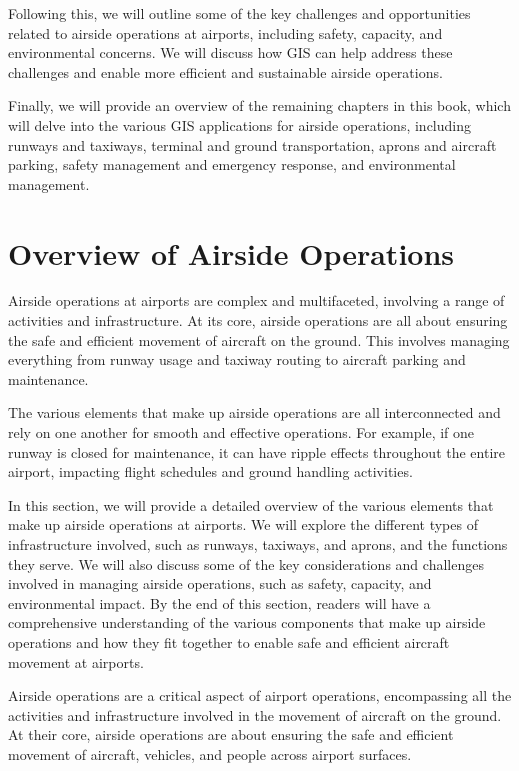 Following this, we will outline some of the key challenges and opportunities related to airside operations at airports, including safety, capacity, and environmental concerns. We will discuss how GIS can help address these challenges and enable more efficient and sustainable airside operations.

Finally, we will provide an overview of the remaining chapters in this book, which will delve into the various GIS applications for airside operations, including runways and taxiways, terminal and ground transportation, aprons and aircraft parking, safety management and emergency response, and environmental management.

\section{Overview of Airside Operations}

Airside operations at airports are complex and multifaceted, involving a range of activities and infrastructure. At its core, airside operations are all about ensuring the safe and efficient movement of aircraft on the ground. This involves managing everything from runway usage and taxiway routing to aircraft parking and maintenance.

The various elements that make up airside operations are all interconnected and rely on one another for smooth and effective operations. For example, if one runway is closed for maintenance, it can have ripple effects throughout the entire airport, impacting flight schedules and ground handling activities.

In this section, we will provide a detailed overview of the various elements that make up airside operations at airports. We will explore the different types of infrastructure involved, such as runways, taxiways, and aprons, and the functions they serve. We will also discuss some of the key considerations and challenges involved in managing airside operations, such as safety, capacity, and environmental impact. By the end of this section, readers will have a comprehensive understanding of the various components that make up airside operations and how they fit together to enable safe and efficient aircraft movement at airports.

Airside operations are a critical aspect of airport operations, encompassing all the activities and infrastructure involved in the movement of aircraft on the ground. At their core, airside operations are about ensuring the safe and efficient movement of aircraft, vehicles, and people across airport surfaces.

